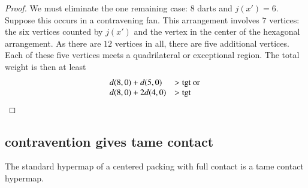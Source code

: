 \begin{proof} We must eliminate the one remaining case: $8$ darts and $j(x')=6$.  Suppose this occurs in a contravening fan.  This arrangement involves $7$ vertices: the six vertices counted by $j(x')$ and the vertex in the center of the hexagonal arrangement.  As there are $12$ vertices in all, there are five additional vertices.  Each of these five vertices meets a quadrilateral or exceptional region.  The total weight is then at least
$$
\begin{array}{lll}
d(8,0) + d(5,0) &> {\operatorname{tgt}}\hbox{ or }\\
d(8,0) + 2 d(4,0) &> {\operatorname{tgt}}\\
\end{array}
$$
\end{proof}









\subsection{contravention gives tame contact}

\begin{theorem} The standard hypermap of a centered packing with full contact is a tame contact hypermap.
\end{theorem}

